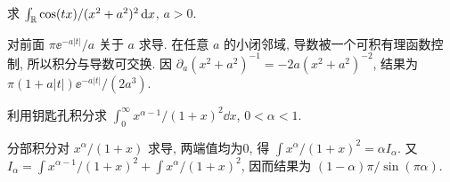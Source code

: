 \begin{exercise}
求 $\int_\mathbb R\cos(tx)/(x^2+a^2)^2\,\mathrm d x$, $a>0$.
\end{exercise}
\begin{solution}
对前面 $\pi\ee^{-a|t|}/a$ 关于 $a$ 求导. 在任意 $a$ 的小闭邻域, 导数被一个可积有理函数控制, 所以积分与导数可交换. 因 $\partial_a(x^2+a^2)^{-1}=-2a(x^2+a^2)^{-2}$, 结果为 $\pi(1+a|t|)\ee^{-a|t|}/(2a^3)$.
\end{solution}
\begin{exercise}
利用钥匙孔积分求 $\int_0^\infty x^{\alpha-1}/(1+x)^2\dd x$, $0<\alpha<1$.
\end{exercise}
\begin{solution}
分部积分对 $x^\alpha/(1+x)$ 求导, 两端值均为0, 得 $\int x^\alpha/(1+x)^2=\alpha I_\alpha$. 又 $I_\alpha=\int x^{\alpha-1}/(1+x)^2+\int x^\alpha/(1+x)^2$, 因而结果为 $(1-\alpha)\pi/\sin(\pi\alpha)$.
\end{solution}
